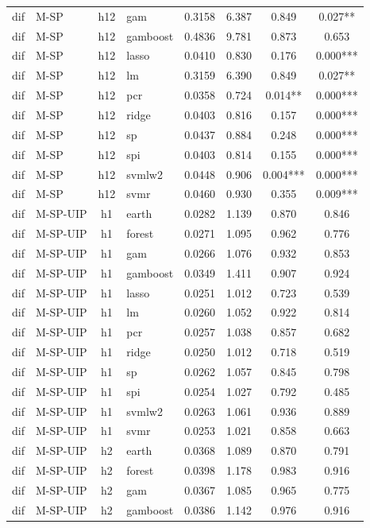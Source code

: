 \begin{ThreePartTable}
\begin{longtable}[t]{llclcccc}
dif & M-SP & h12 & gam & 0.3158 & 6.387 & 0.849 & 0.027**\\
dif & M-SP & h12 & gamboost & 0.4836 & 9.781 & 0.873 & 0.653\\
dif & M-SP & h12 & lasso & 0.0410 & 0.830 & 0.176 & 0.000***\\
dif & M-SP & h12 & lm & 0.3159 & 6.390 & 0.849 & 0.027**\\
dif & M-SP & h12 & pcr & 0.0358 & 0.724 & 0.014** & 0.000***\\
dif & M-SP & h12 & ridge & 0.0403 & 0.816 & 0.157 & 0.000***\\
dif & M-SP & h12 & sp & 0.0437 & 0.884 & 0.248 & 0.000***\\
dif & M-SP & h12 & spi & 0.0403 & 0.814 & 0.155 & 0.000***\\
dif & M-SP & h12 & svmlw2 & 0.0448 & 0.906 & 0.004*** & 0.000***\\
dif & M-SP & h12 & svmr & 0.0460 & 0.930 & 0.355 & 0.009***\\
\addlinespace
dif & M-SP-UIP & h1 & earth & 0.0282 & 1.139 & 0.870 & 0.846\\
dif & M-SP-UIP & h1 & forest & 0.0271 & 1.095 & 0.962 & 0.776\\
dif & M-SP-UIP & h1 & gam & 0.0266 & 1.076 & 0.932 & 0.853\\
dif & M-SP-UIP & h1 & gamboost & 0.0349 & 1.411 & 0.907 & 0.924\\
dif & M-SP-UIP & h1 & lasso & 0.0251 & 1.012 & 0.723 & 0.539\\
dif & M-SP-UIP & h1 & lm & 0.0260 & 1.052 & 0.922 & 0.814\\
dif & M-SP-UIP & h1 & pcr & 0.0257 & 1.038 & 0.857 & 0.682\\
dif & M-SP-UIP & h1 & ridge & 0.0250 & 1.012 & 0.718 & 0.519\\
dif & M-SP-UIP & h1 & sp & 0.0262 & 1.057 & 0.845 & 0.798\\
dif & M-SP-UIP & h1 & spi & 0.0254 & 1.027 & 0.792 & 0.485\\
dif & M-SP-UIP & h1 & svmlw2 & 0.0263 & 1.061 & 0.936 & 0.889\\
dif & M-SP-UIP & h1 & svmr & 0.0253 & 1.021 & 0.858 & 0.663\\
\addlinespace
dif & M-SP-UIP & h2 & earth & 0.0368 & 1.089 & 0.870 & 0.791\\
dif & M-SP-UIP & h2 & forest & 0.0398 & 1.178 & 0.983 & 0.916\\
dif & M-SP-UIP & h2 & gam & 0.0367 & 1.085 & 0.965 & 0.775\\
dif & M-SP-UIP & h2 & gamboost & 0.0386 & 1.142 & 0.976 & 0.916\\

\end{longtable}
\end{ThreePartTable}
